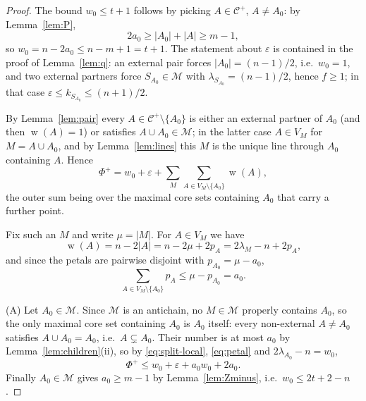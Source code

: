\documentclass[11pt,a4paper]{amsart}
\theoremstyle{plain}
\theoremstyle{definition}
\newcommand{\Cc}{\mathcal{C}}
\newcommand{\Mm}{\mathcal{M}}
\newcommand{\Cp}{\Cc^{+}}
\DeclareMathOperator{\wt}{w}
\begin{document}
\begin{proof}
The bound $w_0\le t+1$ follows by picking $A\in\Cp$, $A\ne A_0$: by
Lemma~\ref{lem:P},
\[
  2a_0\ge |A_0|+|A|\ge m-1,
\]
so $w_0=n-2a_0\le n-m+1=t+1$. The statement about $\varepsilon$ is contained in
the proof of Lemma~\ref{lem:q}: an external pair forces
$|A_0|=(n-1)/2$, i.e.\ $w_0=1$, and two external partners force
$S_{A_0}\in\Mm$ with $\lambda_{S_{A_0}}=(n-1)/2$, hence $f\ge1$; in that case
$\varepsilon\le k_{S_{A_0}}\le(n+1)/2$.

By Lemma~\ref{lem:pair} every $A\in\Cp\setminus\{A_0\}$ is either an external
partner of $A_0$ (and then $\wt(A)=1$) or satisfies $A\cup A_0\in\Mm$; in the
latter case $A\in V_M$ for $M=A\cup A_0$, and by Lemma~\ref{lem:lines} this $M$
is the unique line through $A_0$ containing $A$. Hence
\begin{equation}\label{eq:split-local}
  \Phi^+
  =
  w_0+\varepsilon+
  \sum_M\sum_{A\in V_M\setminus\{A_0\}}\wt(A),
\end{equation}
the outer sum being over the maximal core sets containing $A_0$ that carry a
further point.

Fix such an $M$ and write $\mu=|M|$. For $A\in V_M$ we have
\[
  \wt(A)=n-2|A|=n-2\mu+2p_A=2\lambda_M-n+2p_A,
\]
and since the petals are pairwise disjoint with $p_{A_0}=\mu-a_0$,
\begin{equation}\label{eq:petal}
  \sum_{A\in V_M\setminus\{A_0\}}p_A
  \le
  \mu-p_{A_0}
  =
  a_0.
\end{equation}

(A) Let $A_0\in\Mm$. Since $\Mm$ is an antichain, no $M\in\Mm$ properly contains
$A_0$, so the only maximal core set containing $A_0$ is $A_0$ itself: every
non-external $A\ne A_0$ satisfies $A\cup A_0=A_0$, i.e.\ $A\subsetneq A_0$.
Their number is at most $a_0$ by Lemma~\ref{lem:children}(ii), so by
\eqref{eq:split-local}, \eqref{eq:petal} and $2\lambda_{A_0}-n=w_0$,
\[
  \Phi^+\le w_0+\varepsilon+a_0w_0+2a_0.
\]
Finally $A_0\in\Mm$ gives $a_0\ge m-1$ by Lemma~\ref{lem:Zminus}, i.e.\
$w_0\le2t+2-n$.


\end{proof}
\end{document}
